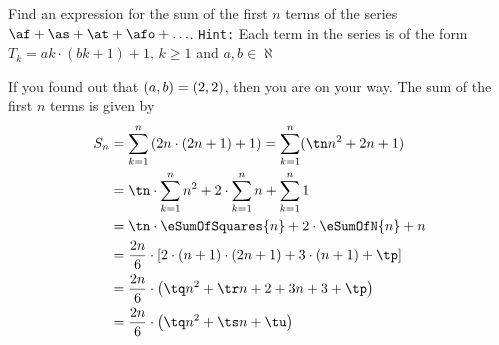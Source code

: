 \question[3] Find an expression for the sum of the first $n$ terms of the series 
$\af + \as + \at + \afo + \ldots$. \texttt{Hint:} Each term in the series is of the 
form $T_k = ak\cdot(bk + 1) + 1,\, k \geq 1$ and $a,b \in\aleph$

\watchout
{}

\ifprintanswers
\fi 

\begin{solution}[\halfpage]
  If you found out that $(a,b) = (2, 2)$, then you are on your way. The sum of the 
  first $n$ terms is given by
	\begin{align}
		S_n &= \sum_{k=1}^{n}\left(\vbone n\cdot(\vbtwo n+1)+1\right) = \sum_{k=1}^{n}(\tn n^2+\vbone n + 1) \\
		&= \tn\cdot\sum_{k=1}^{n}n^2 + \vbone\cdot\sum_{k=1}^{n}n + \sum_{k=1}^{n}1 \\
		&= \tn\cdot\eSumOfSquares{n} + \vbone\cdot\eSumOfN{n} + n \\
		&= \dfrac{\vbone n}{6}\cdot\left[ \vbtwo\cdot(n+1)\cdot(2n+1) + 3\cdot(n+1) + \tp \right] \\
		&= \dfrac{\vbone n}{6}\cdot\left( \tq n^2 + \tr n + \vbtwo + 3n + 3 + \tp \right) \\
		&= \dfrac{\vbone n}{6}\cdot\left( \tq n^2 + \ts n + \tu \right)
	\end{align}
\end{solution}
